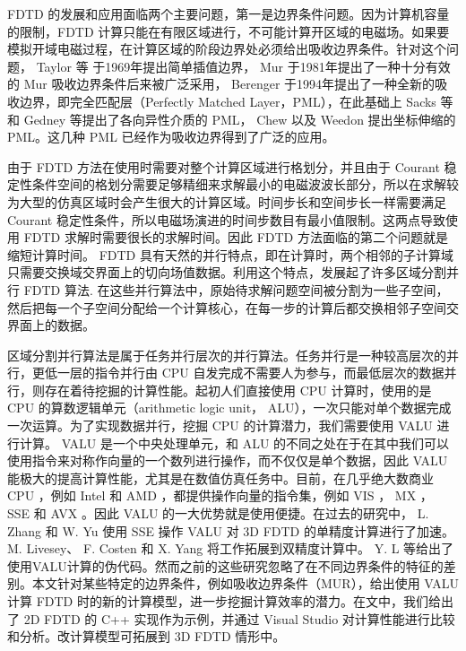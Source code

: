 FDTD 的发展和应用面临两个主要问题，第一是边界条件问题。因为计算机容量的限制，FDTD 计算只能在有限区域进行，不可能计算开区域的电磁场。如果要模拟开域电磁过程，在计算区域的阶段边界处必须给出吸收边界条件。针对这个问题， Taylor 等 \cite{taylor} 于1969年提出简单插值边界， Mur \cite{mur1981absorbing} 于1981年提出了一种十分有效的 Mur 吸收边界条件后来被广泛采用， Berenger \cite{berenger1994perfectly} 于1994年提出了一种全新的吸收边界，即完全匹配层（Perfectly Matched Layer，PML），在此基础上 Sacks \cite{sacks} 等和 Gedney \cite{gedney} 等提出了各向异性介质的 PML， Chew 以及 Weedon \cite{chew} 提出坐标伸缩的 PML。这几种 PML 已经作为吸收边界得到了广泛的应用。

由于 FDTD 方法在使用时需要对整个计算区域进行格划分，并且由于 Courant 稳定性条件空间的格划分需要足够精细来求解最小的电磁波波长部分，所以在求解较为大型的仿真区域时会产生很大的计算区域。时间步长和空间步长一样需要满足 Courant 稳定性条件，所以电磁场演进的时间步数目有最小值限制。这两点导致使用 FDTD 求解时需要很长的求解时间。因此 FDTD 方法面临的第二个问题就是缩短计算时间。 FDTD 具有天然的并行特点，即在计算时，两个相邻的子计算域只需要交换域交界面上的切向场值数据。利用这个特点，发展起了许多区域分割并行 FDTD 算法. 在这些并行算法中，原始待求解问题空间被分割为一些子空间，然后把每一个子空间分配给一个计算核心，在每一步的计算后都交换相邻子空间交界面上的数据。

区域分割并行算法是属于任务并行层次的并行算法。任务并行是一种较高层次的并行，更低一层的指令并行由 CPU 自发完成不需要人为参与，而最低层次的数据并行，则存在着待挖掘的计算性能。起初人们直接使用 CPU 计算时，使用的是 CPU 的算数逻辑单元（arithmetic logic unit， ALU），一次只能对单个数据完成一次运算。为了实现数据并行，挖掘 CPU 的计算潜力，我们需要使用 VALU 进行计算。 VALU 是一个中央处理单元，和 ALU 的不同之处在于在其中我们可以使用指令来对称作向量的一个数列进行操作，而不仅仅是单个数据，因此 VALU 能极大的提高计算性能，尤其是在数值仿真任务中。目前，在几乎绝大数商业 CPU ，例如 Intel 和 AMD ，都提供操作向量的指令集，例如 VIS ， MX ， SSE 和 AVX 。因此 VALU 的一大优势就是使用便捷。在过去的研究中， L. Zhang 和 W. Yu \cite{LZhangandWYu} 使用 SSE 操作 VALU 对 3D FDTD 的单精度计算进行了加速。 M. Livesey、 F. Costen 和 X. Yang \cite{Doubleprecision} 将工作拓展到双精度计算中。 Y. L \cite{AdvancedFDTDMethod} 等给出了使用VALU计算的伪代码。然而之前的这些研究忽略了在不同边界条件的特征的差别。本文针对某些特定的边界条件，例如吸收边界条件（MUR），给出使用 VALU 计算 FDTD 时的新的计算模型，进一步挖掘计算效率的潜力。在文中，我们给出了 2D FDTD 的 C++ 实现作为示例，并通过 Visual Studio 对计算性能进行比较和分析。改计算模型可拓展到 3D FDTD 情形中。

